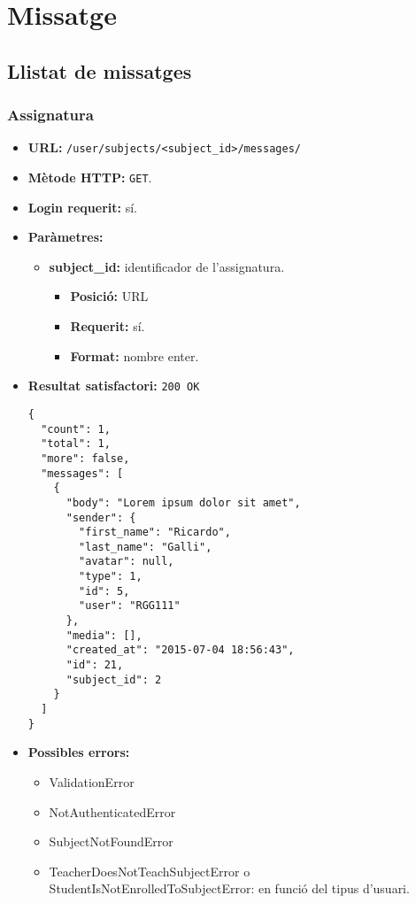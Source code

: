 \section{Missatge}

\subsection{Llistat de missatges}

	\subsubsection{Assignatura}
	\begin{itemize}
\item \textbf{\ac{URL}:} \texttt{/user/subjects/<subject\_id>/messages/}
\item \textbf{Mètode \ac{HTTP}: } \texttt{GET}.
\item \textbf{Login requerit:} sí.
\item \textbf{Paràmetres:}
	\begin{itemize}
		\item \textbf{subject\_id:} identificador de l'assignatura.
		\begin{itemize}
			\item \textbf{Posició:} \ac{URL}
			\item \textbf{Requerit:} sí.
			\item \textbf{Format:} nombre enter.
		\end{itemize}
	\end{itemize}
\item \textbf{Resultat satisfactori:} \texttt{200 OK}
	\begin{verbatim}
{
  "count": 1,
  "total": 1,
  "more": false,
  "messages": [
    {
      "body": "Lorem ipsum dolor sit amet",
      "sender": {
        "first_name": "Ricardo",
        "last_name": "Galli",
        "avatar": null,
        "type": 1,
        "id": 5,
        "user": "RGG111"
      },
      "media": [],
      "created_at": "2015-07-04 18:56:43",
      "id": 21,
      "subject_id": 2
    }
  ]
}
	\end{verbatim}
\item \textbf{Possibles errors:}
	\begin{itemize}
		\item ValidationError
		\item NotAuthenticatedError
		\item SubjectNotFoundError
		\item TeacherDoesNotTeachSubjectError o StudentIsNotEnrolledToSubjectError: en funció del tipus d'usuari.
	
	\end{itemize}
	\end{itemize}
	
